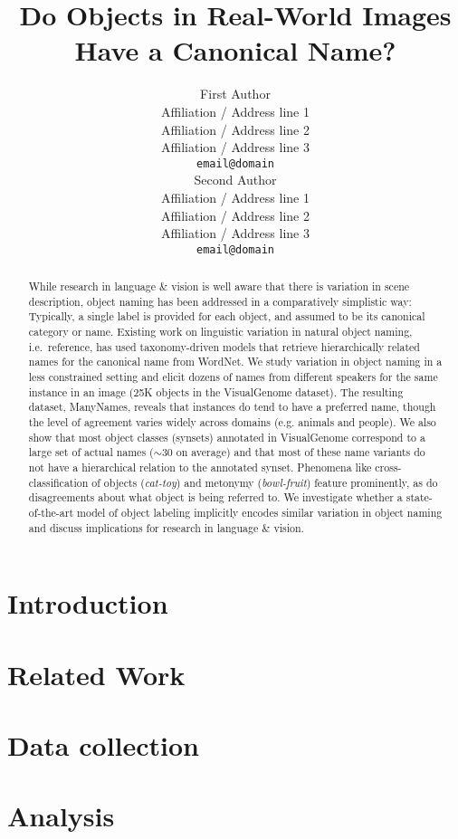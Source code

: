 \documentclass[11pt,a4paper]{article}
\title{Do Objects in Real-World Images Have a Canonical Name?}
\author{First Author \\
	Affiliation / Address line 1 \\
	Affiliation / Address line 2 \\
	Affiliation / Address line 3 \\
	{\tt email@domain} \\\And
	Second Author \\
	Affiliation / Address line 1 \\
	Affiliation / Address line 2 \\
	Affiliation / Address line 3 \\
	{\tt email@domain} \\}
\date{}
\begin{document}
	\maketitle
	
	\begin{abstract}
		While research in language \& vision is well aware that there is variation in scene description, object naming has been addressed in a comparatively simplistic way: 
		Typically, a single label is provided for each object, and assumed to be its canonical category or name.
		Existing work on linguistic variation in natural object naming, i.e.\ reference, has used taxonomy-driven models that retrieve hierarchically related names for the canonical name from WordNet. 
		We study variation in object naming in a less constrained setting and elicit dozens of names from different speakers for the same instance in an image (25K objects in the VisualGenome dataset).
		The resulting dataset, ManyNames, reveals that instances do tend to have a preferred name, though the level of agreement varies widely across domains (e.g. animals and people).
		We also show that most object classes (synsets) annotated in VisualGenome correspond to a large set of actual names ($\sim$30 on average) and that most of these name variants do not have a hierarchical relation to the annotated synset.
		Phenomena like cross-classification of objects (\textit{cat-toy}) and metonymy (\textit{bowl-fruit}) feature prominently, as do disagreements about what object is being referred to.
		We investigate whether a state-of-the-art model of object labeling implicitly encodes similar variation in object naming and discuss implications for research in language \& vision.
	\end{abstract}
	
	\section{Introduction}
	
	
	\section{Related Work}
	\label{sec:relwork}
	
	
	\section{Data collection}
	\label{sec:data}
	
	
	\section{Analysis}
	\label{sec:analysis}
	
	
\end{document}
